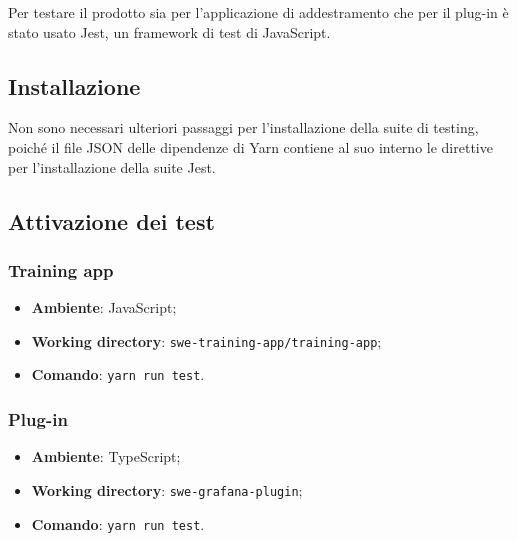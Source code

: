 \documentclass[../manuale-sviluppatore.tex]{subfiles}
\begin{document}
    Per testare il prodotto sia per l'applicazione di addestramento che per il plug-in è stato usato Jest, un framework di test di JavaScript.

    \subsection{Installazione}%
    \label{subs:installazione}
    Non sono necessari ulteriori passaggi per l'installazione della suite di testing, poiché il file JSON delle dipendenze di Yarn contiene al suo interno le direttive per l'installazione della suite Jest.

    \subsection{Attivazione dei test}%
    \label{subs:attivazione-dei-test}
    \subsubsection{Training app}
    \begin{itemize}
      \item \textbf{Ambiente}: JavaScript;
      \item \textbf{Working directory}: \texttt{swe-training-app/training-app};
      \item \textbf{Comando}: \texttt{yarn run test}.
    \end{itemize}

    \subsubsection{Plug-in}
    \begin{itemize}
      \item \textbf{Ambiente}: TypeScript;
      \item \textbf{Working directory}: \texttt{swe-grafana-plugin};
      \item \textbf{Comando}: \texttt{yarn run test}.
    \end{itemize}
\end{document}

